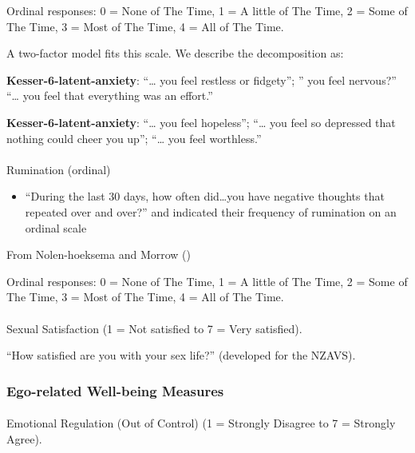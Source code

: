 \documentclass[
  single column]{article}
\makeatletter
\let\oldparagraph\paragraph
\renewcommand{\paragraph}{
    \@ifstar
      \xxxParagraphStar
      \xxxParagraphNoStar
  }
\newcommand{\xxxParagraphStar}[1]{\oldparagraph*{#1}\mbox{}}
\newcommand{\xxxParagraphNoStar}[1]{\oldparagraph{#1}\mbox{}}
\providecommand{\tightlist}{%
  \setlength{\itemsep}{0pt}\setlength{\parskip}{0pt}}\usepackage{longtable,booktabs,array}
\makeatother
\begin{document}
Ordinal responses: 0 = None of The Time, 1 = A little of The Time, 2 =
Some of The Time, 3 = Most of The Time, 4 = All of The Time.

A two-factor model fits this scale. We describe the decomposition as:

\textbf{Kesser-6-latent-anxiety}: ``\ldots{} you feel restless or
fidgety''; '' you feel nervous?'' ``\ldots{} you feel that everything
was an effort.''

\textbf{Kesser-6-latent-anxiety}: ``\ldots{} you feel hopeless'';
``\ldots{} you feel so depressed that nothing could cheer you up'';
``\ldots{} you feel worthless.''

\paragraph{Rumination (ordinal)}\label{rumination-ordinal}

\begin{itemize}
\tightlist
\item
  ``During the last 30 days, how often did\ldots you have negative
  thoughts that repeated over and over?'' and indicated their frequency
  of rumination on an ordinal scale
\end{itemize}

From Nolen-hoeksema and Morrow
()

Ordinal responses: 0 = None of The Time, 1 = A little of The Time, 2 =
Some of The Time, 3 = Most of The Time, 4 = All of The Time.

\paragraph{Sexual Satisfaction (1 = Not satisfied to 7 = Very
satisfied).}\label{sexual-satisfaction-1-not-satisfied-to-7-very-satisfied.}

``How satisfied are you with your sex life?'' (developed for the NZAVS).

\subsubsection{Ego-related Well-being
Measures}\label{ego-related-well-being-measures}

\paragraph{Emotional Regulation (Out of Control) (1 = Strongly Disagree
to 7 = Strongly
Agree).}\label{emotional-regulation-out-of-control-1-strongly-disagree-to-7-strongly-agree.}
\end{document}
